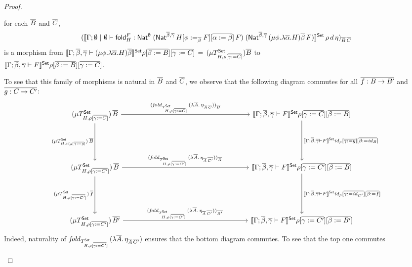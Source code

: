 \documentclass[acmsmall,review,anonymous]{acmart}
\theoremstyle{definition}
\newcommand{\set}{\mathsf{Set}}
\renewcommand{\id}{\mathit{id}}
\begin{document}
\begin{proof}
\begin{itemize}
for each $\overline{B}$ and $\overline{C}$,
\[(\setsem{\Gamma; \emptyset~|~\emptyset \vdash \fold^F_H :
  \Nat^\emptyset\;(\Nat^{\ol{\beta}, \ol{\gamma}}\,H[\phi
    :=_{\ol{\beta}} F][\ol{\alpha := \beta}]\,F)\;
  (\Nat^{{\ol{\beta},\ol{\gamma}} }\,(\mu \phi.\lambda \overline
  \alpha.H)\overline \beta\,F)}\,\rho\,d\,\eta)_{\ol{B}\,\ol{C}}\] is a
morphism from
$\setsem{\Gamma; \ol{\beta},\ol{\gamma} \vdash (\mu
  \phi.\lambda \overline \alpha.H)\overline \beta}\rho[\ol{\beta :=
    B}][\ol{\gamma := C}]\,=\, (\mu T^\set_{H,\rho[\ol{\gamma := C}]})
\ol{B}$ to\\ $\setsem{\Gamma;\ol{\beta},\ol{\gamma} \vdash
  F}\rho[\ol{\beta := B}][\ol{\gamma := C}]$.

To see that this family of morphisms is natural in $\overline{B}$ and
$\overline{C}$, we observe that the following diagram commutes for all
$\overline{f : B \to B'}$ and $\overline{g : C \to C'}$:
{\tiny
\[\begin{tikzcd}[column sep=2.5in, row sep=0.75in]
(\mu T^\set_{H,\rho[\ol{\gamma := C}]})\, \ol{B}
\ar[d, "{(\mu T^\set_{H,\id_\rho[\ol{\gamma := g}]}) \, \ol{B}}"'] \ar[r, 
  "{(\mathit{fold}_{T^\set_{H,\rho[\ol{\gamma := C}]}}\,(\lambda
    \ol{A}.\,\eta_{\ol{A}\,\ol{C}}))_{\ol{B}}}"] 
& \setsem{\Gamma; \ol{\beta},\ol{\gamma} \vdash F}\rho[\ol{\gamma :=
    C}][\ol{\beta := B}]\ar[d, "{\setsem{\Gamma;
      \ol{\beta},\ol{\gamma} \vdash F}\id_\rho[\ol{\gamma := 
    g}][\ol{\beta := \id_B}]}"]\\
(\mu T^\set_{H,\rho[\ol{\gamma := C'}]})\, \ol{B} 
\ar[r,"{(\mathit{fold}_{T^\set_{H,\rho[\ol{\gamma :=
            C'}]}}\,(\lambda \ol{A}.\,\eta_{\ol{A}\,\ol{C'}}))_{\ol{B}}\,}" ] 
\ar[d, "{(\mu T^\set_{H,\rho[\ol{\gamma := C'}]}) \, \ol{f}}"'] & 
 \setsem{\Gamma; \ol{\beta},\ol{\gamma} \vdash F}\rho[\ol{\gamma :=
    C'}][\ol{\beta := B}]\ar[d, "{\setsem{\Gamma;
      \ol{\beta},\ol{\gamma} \vdash F}\id_\rho[\ol{\gamma := 
    \id_{C'}}][\ol{\beta := f}]}"]\\
 (\mu T^\set_{H,\rho[\ol{\gamma := C'}]})\, \ol{B'} 
\ar[r,"{(\mathit{fold}_{T^\set_{H,\rho[\ol{\gamma :=
            C'}]}}\,(\lambda \ol{A}.\,\eta_{\ol{A}\,\ol{C'}}))_{\ol{B'}}\,}"
] &  
 \setsem{\Gamma; \ol{\beta},\ol{\gamma} \vdash F}\rho[\ol{\gamma :=
    C'}][\ol{\beta := B'}]
\end{tikzcd}\]}
Indeed, naturality of $\mathit{fold}_{T^\set_{H,\rho[\ol{\gamma :=
        C'}]}}\,(\lambda \ol{A}.\,\eta_{\ol{A}\,\ol{C'}})$ ensures that
the bottom diagram commutes. To see that the top one commutes

\end{itemize}
\end{proof}
\end{document}
